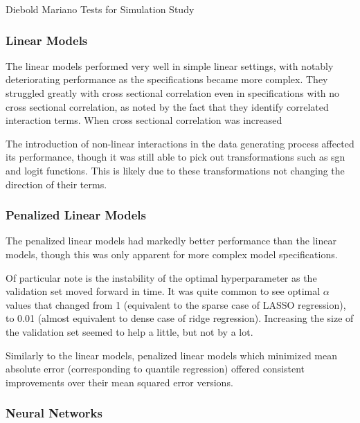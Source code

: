 \documentclass[a4paper, table]{article}
\begin{document}
\begin{table}
	\caption{Diebold Mariano Tests for Simulation Study}
\end{table}


\subsubsection{Linear Models}

The linear models performed very well in simple linear settings, with notably deteriorating performance as the specifications became more complex. They struggled greatly with cross sectional correlation even in specifications with no cross sectional correlation, as noted by the fact that they identify correlated interaction terms. When cross sectional correlation was increased

The introduction of non-linear interactions in the data generating process affected its performance, though it was still able to pick out transformations such as sgn and logit functions. This is likely due to these transformations not changing the direction of their terms.

\subsubsection{Penalized Linear Models}

The penalized linear models had markedly better performance than the linear models, though this was only apparent for more complex model specifications. 

Of particular note is the instability of the optimal hyperparameter as the validation set moved forward in time. It was quite common to see optimal $\alpha$ values that changed from 1 (equivalent to the sparse case of LASSO regression), to 0.01 (almost equivalent to dense case of ridge regression). Increasing the size of the validation set seemed to help a little, but not by a lot. 

Similarly to the linear models, penalized linear models which minimized mean absolute error (corresponding to quantile regression) offered consistent improvements over their mean squared error versions.

\subsubsection{Neural Networks}

\end{document}
